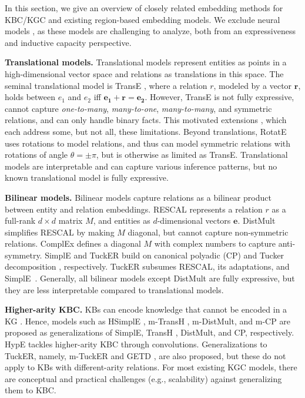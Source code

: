\documentclass{article}
\begin{document}
In this section, we give an overview of closely related embedding methods for KBC/KGC  and existing region-based embedding models. We exclude neural models \cite{ConvE-AAAI18,EMLP-NIPS13,KBGAT-ACL19}, as these models are challenging to analyze, both from an expressiveness and inductive capacity perspective. 

\textbf{Translational models.} Translational models represent entities as points in a high-dimensional vector space and relations as translations in this space. The seminal translational model is TransE \cite{TransE-NIPS13}, where a relation $r$, modeled by a vector $\bm{r}$, holds between $e_1$ and $e_2$ iff $\bm{e_1} + \bm{r} = \bm{e_2}$. However, TransE is not fully expressive, cannot capture \emph{one-to-many}, \emph{many-to-one},  \emph{many-to-many}, and symmetric relations, and can only handle binary facts. 
This motivated extensions \cite{TransH-AAAI14, TransR-AAAI15,TranSparse-AAAI16,TransF-KR16}, which each address some, but not all,  these limitations. 
Beyond translations, RotatE \cite{RotatE-ICLR19} uses rotations to model relations, and thus can model symmetric relations with rotations of angle $\theta = \pm \pi$, but is otherwise as limited as TransE. 
Translational models are interpretable and can capture various inference patterns, but no known translational model is fully expressive. 


\textbf{Bilinear models.} Bilinear models capture relations as a bilinear product between entity and relation embeddings. RESCAL \cite{RESCAL-ICML11} represents a relation $r$ as a full-rank $d \times d$ matrix $M$, and entities as $d$-dimensional vectors $\bm{e}$. DistMult \cite{DistMult-ICLR15} simplifies RESCAL by making $M$ diagonal, but cannot capture non-symmetric relations.
ComplEx \cite{ComplEx-ICML16} defines a diagonal $M$ with complex numbers to capture anti-symmetry. SimplE \cite{SimplE-NeurIPS18} and TuckER \cite{TuckER} build on canonical polyadic (CP) \cite{hitchcock1927expression} and Tucker decomposition \cite{tucker1966some}, respectively. TuckER subsumes RESCAL, its adaptations, and SimplE~\cite{TuckER}. 
Generally, all bilinear models except DistMult are fully expressive, but they are less interpretable compared to translational models.


\textbf{Higher-arity KBC.}
KBs can encode knowledge that cannot be encoded in a KG \cite{Fatemi19}. Hence, models such as HSimplE \cite{Fatemi19}, m-TransH \cite{Wen16}, m-DistMult, and m-CP \cite{Fatemi19} are proposed as generalizations of SimplE, TransH \cite{TransH-AAAI14}, DistMult, and CP, respectively.  HypE \cite{Fatemi19} tackles higher-arity KBC through convolutions. 
Generalizations to TuckER, namely,  m-TuckER and GETD \cite{Liu20}, are also proposed, but these do not apply to KBs with different-arity relations.
For most existing KGC models, there are conceptual and practical challenges (e.g., scalability) against generalizing them to KBC.
\end{document}
